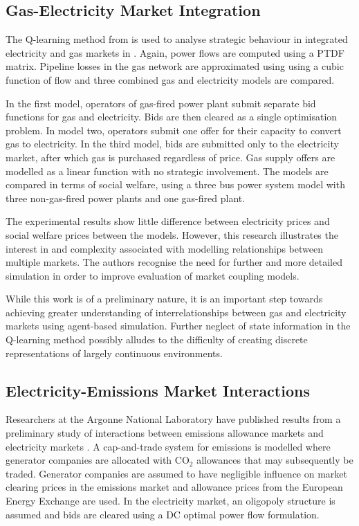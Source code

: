 \subsection{Gas-Electricity Market Integration}
The Q-learning method from  is used to
analyse strategic behaviour in integrated electricity and gas markets in
.  Again, power flows are computed using a PTDF matrix.
Pipeline losses in the gas network are approximated using using a cubic
function of flow and three combined gas and electricity models are
compared.

In the first model, operators of gas-fired power plant submit separate bid
functions for gas and electricity.  Bids are then cleared as a single
optimisation problem.  In model two, operators submit one offer for their
capacity to convert gas to electricity.  In the third model, bids are
submitted only to the electricity market, after which gas is purchased
regardless of price.  Gas supply offers are modelled as a linear function with
no strategic involvement.  The models are compared in terms of social welfare,
using a three bus power system model with three non-gas-fired power plants and
one gas-fired plant.

The experimental results show little difference between electricity prices and
social welfare prices between the models.  However, this research illustrates
the interest in and complexity associated with modelling relationships between
multiple markets.  The authors recognise the need for further and more detailed
simulation in order to improve evaluation of market coupling models.

While this work is of a preliminary nature, it is an important step towards
achieving greater understanding of interrelationships between gas and
electricity markets using agent-based simulation.  Further neglect of state
information in the Q-learning method possibly alludes to the difficulty of
creating discrete representations of largely continuous environments.

\subsection{Electricity-Emissions Market Interactions}
Researchers at the Argonne National Laboratory have published results from a
preliminary study of interactions between emissions allowance markets and
electricity markets \cite{wang:09}.  A cap-and-trade system for emissions is
modelled where generator companies are allocated with $\mbox{CO}_2$ allowances
that may subsequently be traded.  Generator companies are assumed to have
negligible influence on market clearing prices in the emissions market and
allowance prices from the European Energy Exchange are used.  In the electricity
market, an oligopoly structure is assumed and bids are cleared using a DC
optimal power flow formulation.

